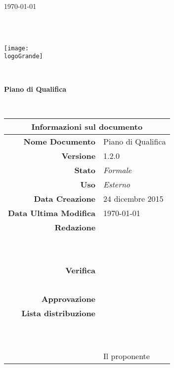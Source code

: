 \documentclass[12pt,a4paper]{article}
\title{\titoloDocumento}
\newcommand{\titoloDocumento}{Piano di Qualifica}
\newcommand{\dataCreazione}{24 dicembre 2015}
\newcommand{\versione}{1.2.0}
\newcommand{\stato}{Formale}
\newcommand{\uso}{Esterno}
\begin{document}
\begin{titlepage}
\begin{center}
\today \\
\vspace{1cm}
\begin{Huge}
\textbf{\nomeGruppo} \\
\end{Huge}
\textbf{\prjL{}} \\
\vspace{1cm}
\texttt{[image: \\logoGrande]}
\vspace{1cm}

\HRule \\[0.4cm]
\begin{Huge}
{\huge \bfseries \titoloDocumento}\\[0.4cm]
\end{Huge}
\HRule \\[1cm]
\vfill

\begin{table}[h]
\begin{center}
\begin{tabular}{r | l}
\multicolumn{2}{c}{\textbf{Informazioni sul documento}}\\
\midrule
\textbf{Nome Documento}	&	\titoloDocumento	\\
\textbf{Versione}	&	\versione	\\
\textbf{Stato}	&	\emph{\stato}	\\
\textbf{Uso}	&	\emph{\uso}	\\
\textbf{Data Creazione}	&	\dataCreazione	\\
\textbf{Data Ultima Modifica}	&	\today	\\
\textbf{Redazione}	& \AB{} \\
\ 	& \AVI{} \\
\ 	& \WS{} \\
\textbf{Verifica}	&	\AVE{}	\\
\ 	& \NDC{} \\
\textbf{Approvazione}	& \IB{} \\
\textbf{Lista distribuzione}	&	\nomeGruppo{}	\\
\ 	&	\Vardanega{}	\\
\ 	&	\Cardin{}	\\
\ 	&	Il proponente \Zucchetti{}	\\

\end{tabular}
\end{center}
\end{table}

\end{center}
\end{titlepage}
\newpage
\end{document}
